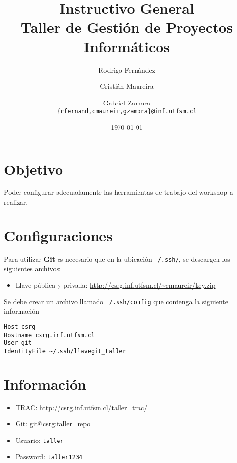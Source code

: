 \documentclass[letter, 10pt]{article}
\begin{document}
\title{Instructivo General\\Taller de Gestión de Proyectos Informáticos}
\author{Rodrigo Fernández \and Cristián Maureira \and Gabriel Zamora\\ \small{\texttt{\{rfernand,cmaureir,gzamora\}@inf.utfsm.cl}}}
\date{\today}
\maketitle

\section{Objetivo}
Poder configurar adecuadamente las herramientas de trabajo del workshop a
realizar.

\section{Configuraciones}
Para utilizar \textbf{Git} es necesario que en la ubicación \texttt{~/.ssh/},
se descargen los siguientes archivos:
\begin{itemize}
	\item Llave pública y privada: \url{http://csrg.inf.utfsm.cl/~cmaureir/key.zip}
\end{itemize}

Se debe crear un archivo llamado \texttt{~/.ssh/config} que contenga la siguiente información.
\begin{verbatim}
Host csrg
Hostname csrg.inf.utfsm.cl
User git
IdentityFile ~/.ssh/llavegit_taller
\end{verbatim}

\section{Información}
\begin{itemize}
	\item TRAC: \url{http://csrg.inf.utfsm.cl/taller_trac/}
	\item Git: \url{git@csrg:taller_repo}
	\item Usuario: \texttt{taller}
	\item Password: \texttt{taller1234}
\end{itemize}
\end{document}
